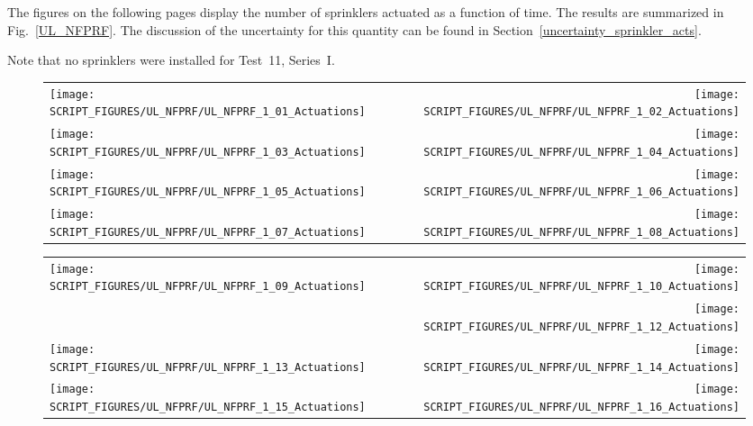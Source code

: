 The figures on the following pages display the number of sprinklers actuated as a function of time. The results are summarized in Fig.~\ref{UL_NFPRF}. The discussion of the uncertainty for this quantity can be found in Section~\ref{uncertainty_sprinkler_acts}.

Note that no sprinklers were installed for Test~11, Series~I.

\newpage

\begin{figure}[p]
\begin{tabular*}{\textwidth}{l@{\extracolsep{\fill}}r}
\texttt{[image: SCRIPT\_FIGURES/UL\_NFPRF/UL\_NFPRF\_1\_01\_Actuations]} &
\texttt{[image: SCRIPT\_FIGURES/UL\_NFPRF/UL\_NFPRF\_1\_02\_Actuations]} \\
\texttt{[image: SCRIPT\_FIGURES/UL\_NFPRF/UL\_NFPRF\_1\_03\_Actuations]} &
\texttt{[image: SCRIPT\_FIGURES/UL\_NFPRF/UL\_NFPRF\_1\_04\_Actuations]} \\
\texttt{[image: SCRIPT\_FIGURES/UL\_NFPRF/UL\_NFPRF\_1\_05\_Actuations]} &
\texttt{[image: SCRIPT\_FIGURES/UL\_NFPRF/UL\_NFPRF\_1\_06\_Actuations]} \\
\texttt{[image: SCRIPT\_FIGURES/UL\_NFPRF/UL\_NFPRF\_1\_07\_Actuations]} &
\texttt{[image: SCRIPT\_FIGURES/UL\_NFPRF/UL\_NFPRF\_1\_08\_Actuations]} \\
\end{tabular*}
\label{UL_NFPRF_1}
\end{figure}

\begin{figure}[p]
\begin{tabular*}{\textwidth}{l@{\extracolsep{\fill}}r}
\texttt{[image: SCRIPT\_FIGURES/UL\_NFPRF/UL\_NFPRF\_1\_09\_Actuations]} &
\texttt{[image: SCRIPT\_FIGURES/UL\_NFPRF/UL\_NFPRF\_1\_10\_Actuations]} \\
&
\texttt{[image: SCRIPT\_FIGURES/UL\_NFPRF/UL\_NFPRF\_1\_12\_Actuations]} \\
\texttt{[image: SCRIPT\_FIGURES/UL\_NFPRF/UL\_NFPRF\_1\_13\_Actuations]} &
\texttt{[image: SCRIPT\_FIGURES/UL\_NFPRF/UL\_NFPRF\_1\_14\_Actuations]} \\
\texttt{[image: SCRIPT\_FIGURES/UL\_NFPRF/UL\_NFPRF\_1\_15\_Actuations]} &
\texttt{[image: SCRIPT\_FIGURES/UL\_NFPRF/UL\_NFPRF\_1\_16\_Actuations]} \\
\end{tabular*}
\label{UL_NFPRF_2}
\end{figure}

